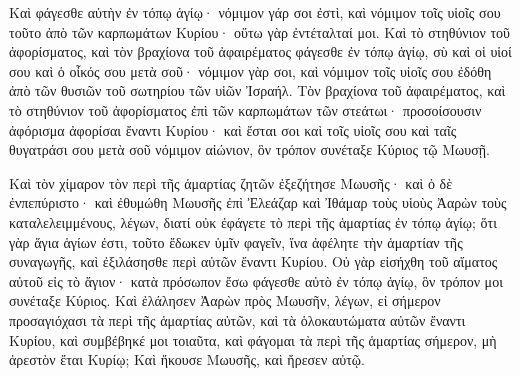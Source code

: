 {Καὶ φάγεσθε αὐτὴν ἐν τόπῳ ἁγίῳ· νόμιμον γάρ σοι ἐστὶ, καὶ νόμιμον τοῖς υἱοῖς σου τοῦτο ἀπὸ τῶν καρπωμάτων Κυρίου· οὕτω γὰρ ἐντέταλταί μοι.
Καὶ τὸ στηθύνιον τοῦ ἀφορίσματος, καὶ τὸν βραχίονα τοῦ ἀφαιρέματος φάγεσθε ἐν τόπῳ ἁγίῳ, σὺ καὶ οἱ υἱοί σου καὶ ὁ οἶκός σου μετὰ σοῦ· νόμιμον γὰρ σοι, καὶ νόμιμον τοῖς υἱοῖς σου ἐδόθη ἀπὸ τῶν θυσιῶν τοῦ σωτηρίου τῶν υἱῶν Ἰσραήλ.
Τὸν βραχίονα τοῦ ἀφαιρέματος, καὶ τὸ στηθύνιον τοῦ ἀφορίσματος ἐπὶ τῶν καρπωμάτων τῶν στεάτωι· προσοίσουσιν ἀφόρισμα ἀφορίσαι ἔναντι Κυρίου· καὶ ἔσται σοι καὶ τοῖς υἱοῖς σου καὶ ταῖς θυγατράσι σου μετὰ σοῦ νόμιμον αἰώνιον, ὃν τρόπον συνέταξε Κύριος τῷ Μωυσῇ.
\par }{\PP {}Καὶ τὸν χίμαρον τὸν περὶ τῆς ἁμαρτίας ζητῶν ἐξεζήτησε Μωυσῆς· καὶ ὁ δὲ ἐνπεπύριστο· καὶ ἐθυμώθη Μωυσῆς ἐπὶ Ἐλεάζαρ καὶ Ἰθάμαρ τοὺς υἱοὺς Ἀαρὼν τοὺς καταλελειμμένους, λέγων,
διατί οὐκ ἐφάγετε τὸ περὶ τῆς ἁμαρτίας ἐν τόπῳ ἁγίῳ; ὅτι γὰρ ἅγια ἁγίων ἐστι, τοῦτο ἔδωκεν ὑμῖν φαγεῖν, ἵνα ἀφέλητε τὴν ἁμαρτίαν τῆς συναγωγῆς, καὶ ἐξιλάσησθε περὶ αὐτῶν ἔναντι Κυρίου.
Οὐ γὰρ εἰσήχθη τοῦ αἵματος αὐτοῦ εἰς τὸ ἅγιον· κατὰ πρόσωπον ἔσω φάγεσθε αὐτὸ ἐν τόπῳ ἁγίῳ, ὃν τρόπον μοι συνέταξε Κύριος.
Καὶ ἐλάλησεν Ἀαρὼν πρὸς Μωυσῆν, λέγων, εἰ σήμερον προσαγιόχασι τὰ περὶ τῆς ἁμαρτίας αὐτῶν, καὶ τὰ ὁλοκαυτώματα αὐτῶν ἔναντι Κυρίου, καὶ συμβέβηκέ μοι τοιαῦτα, καὶ φάγομαι τὰ περὶ τῆς ἁμαρτίας σήμερον, μὴ ἀρεστὸν ἔται Κυρίῳ;
Καὶ ἤκουσε Μωυσῆς, καὶ ἤρεσεν αὐτῷ.

}
